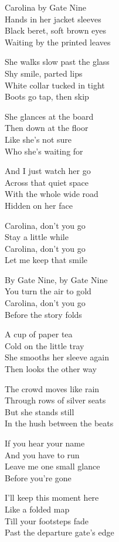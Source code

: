 \begin{lyrics}
Carolina by Gate Nine\\
Hands in her jacket sleeves\\
Black beret, soft brown eyes\\
Waiting by the printed leaves

She walks slow past the glass\\
Shy smile, parted lips\\
White collar tucked in tight\\
Boots go tap, then skip

She glances at the board\\
Then down at the floor\\
Like she's not sure\\
Who she's waiting for

And I just watch her go\\
Across that quiet space\\
With the whole wide road\\
Hidden on her face

Carolina, don’t you go\\
Stay a little while\\
Carolina, don’t you go\\
Let me keep that smile

By Gate Nine, by Gate Nine\\
You turn the air to gold\\
Carolina, don’t you go\\
Before the story folds

A cup of paper tea\\
Cold on the little tray\\
She smooths her sleeve again\\
Then looks the other way

The crowd moves like rain\\
Through rows of silver seats\\
But she stands still\\
In the hush between the beats

If you hear your name\\
And you have to run\\
Leave me one small glance\\
Before you’re gone

I’ll keep this moment here\\
Like a folded map\\
Till your footsteps fade\\
Past the departure gate’s edge


\end{lyrics}

